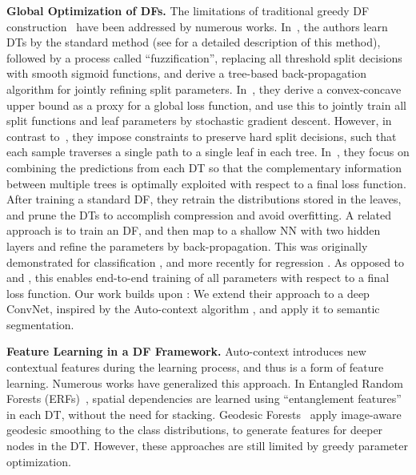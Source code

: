 \documentclass[twocolumn]{svjour3}
\begin{document}
\textbf{Global Optimization of DFs.} The limitations of traditional greedy DF construction~\cite{breiman_2001} have been addressed by numerous works.
In~\cite{SuarezL99}, the authors learn DTs by the standard method (see \cite{Criminisi:2013us} for a detailed description of this method), followed by a process called ``fuzzification'', replacing all threshold split decisions with smooth sigmoid functions, and derive a tree-based back-propagation algorithm for jointly refining split parameters.
In~\cite{Norouzi}, they derive a convex-concave upper bound as a proxy for a global loss function, and use this to jointly train all split functions and leaf parameters by stochastic gradient descent.  However, in contrast to~\cite{SuarezL99}, they impose constraints to preserve hard split decisions, such that each sample traverses a single path to a single leaf in each tree.
In~\cite{shaoqing15grrf}, they focus on combining the predictions from each DT so that the complementary information between multiple trees is optimally exploited with respect to a final loss function.
After training a standard DF, they retrain the distributions stored in the leaves, and prune the DTs to accomplish compression and avoid overfitting.
A related approach is to train an DF, and then map to a shallow NN with two hidden layers and refine the parameters by back-propagation. 
This was originally demonstrated for classification \cite{Sethi1990,Welbl14}, and more recently for regression \cite{welbl:regression}.
As opposed to \cite{SuarezL99} and \cite{shaoqing15grrf}, this enables end-to-end training of all parameters with respect to a final loss function.
Our work builds upon \cite{Sethi1990,Welbl14}: We extend their approach to a deep ConvNet, inspired by the Auto-context algorithm \cite{Tu2010}, and apply it to semantic segmentation.

\textbf{Feature Learning in a DF Framework.}
Auto-context introduces new contextual features during the learning process, and thus is a form of feature learning.
Numerous works have generalized this approach.
In Entangled Random Forests (ERFs)~\cite{ERFs}, spatial dependencies are learned using ``entanglement features'' in each DT, without the need for stacking.
Geodesic Forests~\cite{KontschiederKSC13} apply image-aware geodesic smoothing to the class distributions, to generate features for deeper nodes in the DT.
However, 
these approaches are still limited by greedy parameter optimization.
\end{document}
